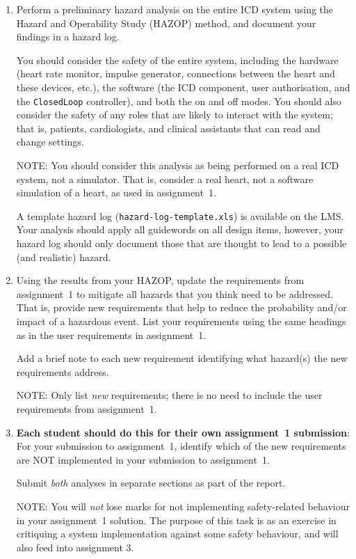 \documentclass[11pt]{article}
\begin{document}
\begin{enumerate}

 \item Perform a preliminary hazard analysis on the entire ICD system using the Hazard and Operability Study (HAZOP) method, and document your findings in a hazard log.

  You should consider the safety of the entire system, including the hardware (heart rate monitor, impulse generator, connections between the heart and these devices, etc.), the software (the ICD component, user authorisation, and the \texttt{ClosedLoop} controller), and both the on and off modes. You should also consider the safety of any roles that are likely to interact with the system; that is, patients, cardiologists, and clinical assistants that can read and change settings.

  NOTE: You should consider this analysis as being performed on a real ICD system, not a simulator. That is, consider a real heart, not a software simulation of a heart, as used in assignment~1.

  A template hazard log (\texttt{hazard-log-template.xls}) is available on the LMS. Your analysis should apply all guidewords on all design items, however, your hazard log should only document those that are thought to lead to a possible (and realistic) hazard.

 \item Using the results from your HAZOP, update the requirements from assignment~1 to mitigate all hazards that you think need to be addressed. That is, provide new requirements  that help to reduce the probability and/or impact of a hazardous event. List your requirements using the same headings as in the user requirements in assignment~1.

Add a brief note to each new requirement identifying what hazard(s) the new requirements address.

 NOTE: Only list \emph{new} requirements; there is no need to include the user requirements from assignment~1.

 \item \textbf{Each student should do this for their own assignment~1 submission}: For your submission to assignment~1, identify which of the new requirements are NOT implemented in your submission to assignment~1.

 Submit \emph{both} analyses in separate sections as part of the report.

 NOTE: You will \emph{not} lose marks for not implementing safety-related behaviour in your assignment~1 solution. The purpose of this task is as an exercise in critiquing a system implementation against some safety behaviour, and will also feed into assignment 3.

\end{enumerate}
\end{document}
